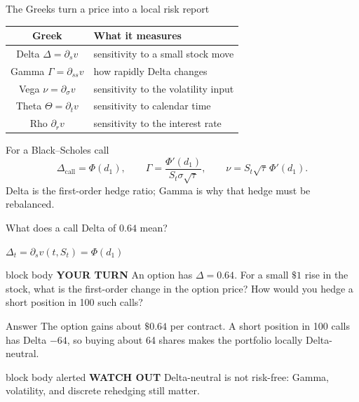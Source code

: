 \documentclass[handout,10pt,aspectratio=169]{beamer}
\newenvironment{simplificationbox}{\begin{beamercolorbox}[rounded=true,sep=0.7em,wd=\textwidth]{block body alerted}
  \textbf{\color{CourseRed}WATCH OUT}\quad}{\end{beamercolorbox}}
\newenvironment{pausebox}{\begin{beamercolorbox}[rounded=true,sep=0.8em,wd=\textwidth]{block body}
  \textbf{\color{CourseGold}YOUR TURN}\quad}{\end{beamercolorbox}}
\newcommand{\1}{\mathbf 1}
\newcommand{\Ncdf}{\Phi}
\newcommand{\greekrecall}[1]{\par{\small\color{CourseBlue}\(\displaystyle #1\)\par}}
\begin{document}
\begin{frame}{The Greeks turn a price into a local risk report}
\begin{center}
\begin{tabular}{c|l}
\toprule
Greek & What it measures\\
\midrule
Delta \(\Delta=\partial_s v\) & sensitivity to a small stock move\\
Gamma \(\Gamma=\partial_{ss}v\) & how rapidly Delta changes\\
Vega \(\nu=\partial_\sigma v\) & sensitivity to the volatility input\\
Theta \(\Theta=\partial_t v\) & sensitivity to calendar time\\
Rho \(\partial_r v\) & sensitivity to the interest rate\\
\bottomrule
\end{tabular}
\end{center}
\begin{block}{For a Black--Scholes call}
\[
\Delta_{\mathrm{call}}=\Ncdf(d_1),
\qquad
\Gamma=\frac{\Ncdf'(d_1)}{S_t\sigma\sqrt{\tau}},\qquad
\nu=S_t\sqrt{\tau}\,\Ncdf'(d_1).
\]
Delta is the first-order hedge ratio; Gamma is why that hedge must be rebalanced.
\end{block}
\end{frame}

\begin{frame}{What does a call Delta of \(0.64\) mean?}
\greekrecall{\Delta_t=\partial_s v(t,S_t)=\Ncdf(d_1)}
\begin{pausebox}
An option has \(\Delta=0.64\). For a small \(\$1\) rise in the stock,
what is the first-order change in the option price? How would you hedge a
short position in 100 such calls?
\end{pausebox}

\begin{exampleblock}{Answer}
The option gains about \(\$0.64\) per contract. A short position in 100 calls
has Delta \(-64\), so buying about 64 shares makes the portfolio locally
Delta-neutral.
\end{exampleblock}
\begin{simplificationbox}
Delta-neutral is not risk-free: Gamma, volatility, and discrete rehedging
still matter.
\end{simplificationbox}
\end{frame}
\end{document}
